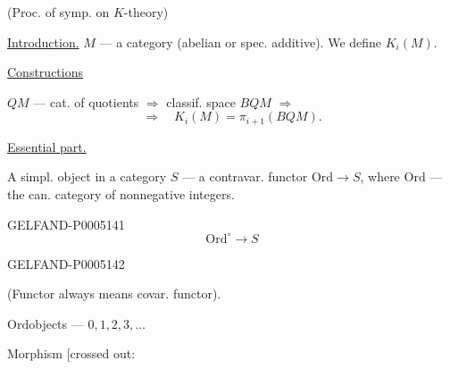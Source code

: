 (Proc. of symp. on $K$-theory)

\uline{Introduction.} $M$ — a category (abelian or spec. additive).
We define $K_i(M)$.

\uline{Constructions}

$QM$ — cat. of quotients $\Rightarrow$ classif. space $BQM$ $\Rightarrow$
\[
\Rightarrow\quad K_i(M)=\pi_{i+1}(BQM).
\]

\uline{Essential part.}

A simpl. object in a category $S$ — a contravar. functor $\mathrm{Ord}\to S$,
where $\mathrm{Ord}$ — the can. category of nonnegative integers.


\begin{GelfandAdjacentEvidence}{GELFAND-P000514}{1}
\[
\mathrm{Ord}^{\circ}\longrightarrow S
\]
\end{GelfandAdjacentEvidence}
\begin{GelfandAdjacentEvidence}{GELFAND-P000514}{2}


(Functor always means covar. functor).

$\mathrm{Ord}$\quad objects — $0,1,2,3,\ldots$

Morphism [crossed out:
\end{GelfandAdjacentEvidence}
